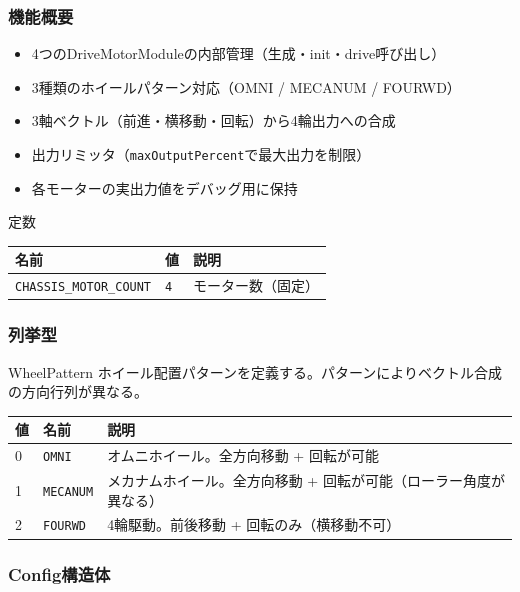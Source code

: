 \subsubsection{機能概要}

\begin{itemize}
    \item 4つのDriveMotorModuleの内部管理（生成・init・drive呼び出し）
    \item 3種類のホイールパターン対応（OMNI / MECANUM / FOURWD）
    \item 3軸ベクトル（前進・横移動・回転）から4輪出力への合成
    \item 出力リミッタ（\texttt{maxOutputPercent}で最大出力を制限）
    \item 各モーターの実出力値をデバッグ用に保持
\end{itemize}

\begin{funcblock}{定数}
\begin{tabularx}{\textwidth}{l l X}
\toprule
\textbf{名前} & \textbf{値} & \textbf{説明} \\
\midrule
\texttt{CHASSIS\_MOTOR\_COUNT} & \texttt{4} & モーター数（固定） \\
\bottomrule
\end{tabularx}
\end{funcblock}

\subsubsection{列挙型}

\begin{funcblock}{WheelPattern}
ホイール配置パターンを定義する。パターンによりベクトル合成の方向行列が異なる。

\begin{longtable}{l l p{6.0cm}}
\toprule
\textbf{値} & \textbf{名前} & \textbf{説明} \\
\midrule
\endhead
0 & \texttt{OMNI}    & オムニホイール。全方向移動 + 回転が可能 \\
1 & \texttt{MECANUM} & メカナムホイール。全方向移動 + 回転が可能（ローラー角度が異なる） \\
2 & \texttt{FOURWD}  & 4輪駆動。前後移動 + 回転のみ（横移動不可） \\
\bottomrule
\end{longtable}
\end{funcblock}

\subsubsection{Config構造体}

